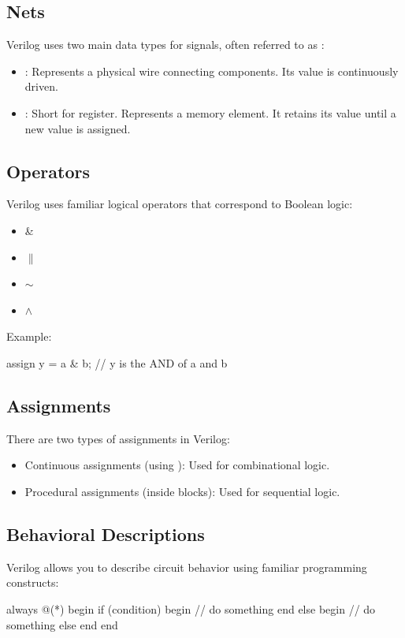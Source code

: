 \documentclass[12pt]{labmanual}
\begin{document}
\subsection{Nets}

Verilog uses two main data types for signals, often referred to as :
\begin{itemize}
    \item {: Represents a physical wire connecting components. Its value is continuously driven.}
    \item {: Short for register. Represents a memory element. It retains its value until a new value is assigned.}
\end{itemize}

\subsection{Operators}

Verilog uses familiar logical operators that correspond to Boolean logic:

\begin{itemize}
  \item {} \& 
  \item {} $\|$
  \item {} $\sim $
  \item {} $\wedge$
\end{itemize}

Example: \begin{codeblock}[language=verilog]
assign y = a & b;  // y is the AND of a and b
\end{codeblock}


\subsection{Assignments}
There are two types of assignments in Verilog:
\begin{itemize}
  \item Continuous assignments (using ): Used for combinational logic.
  \item Procedural assignments (inside  blocks): Used for sequential logic.
\end{itemize}

\subsection{Behavioral Descriptions}
Verilog allows you to describe circuit behavior using familiar programming constructs:
\begin{codeblock}[language=verilog]    
always @(*) begin
    if (condition) begin
        // do something
    end else begin
        // do something else
    end
end
\end{codeblock}
\end{document}
